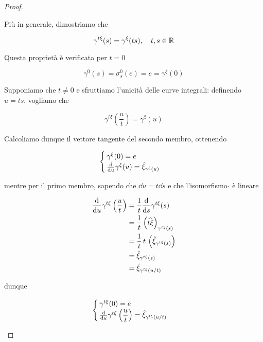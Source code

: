 \begin{proof}
\begin{enumerate}
		Più in generale, dimostriamo che
		
		\begin{equation}
			\gamma^{t \xi}(s) = \gamma^{\xi}(t s) \qcomma t,s \in \R
		\end{equation}
	
		Questa proprietà è verificata per $ t=0 $
		
		\begin{equation}
			\gamma^{0}(s) = \sigma_{s}^{0}(e) = e = \gamma^{\xi}(0)
		\end{equation}
	
		Supponiamo che $ t \neq 0 $ e sfruttiamo l'unicità delle curve integrali: definendo $ u = t s $, vogliamo che
		
		\begin{equation}
			\gamma^{t \xi} \left( \dfrac{u}{t} \right) = \gamma^{\xi}(u)
		\end{equation}
		
		Calcoliamo dunque il vettore tangente del secondo membro, ottenendo
		
		\begin{equation}
			\begin{cases}
				\gamma^{\xi}(0) = e\\
				\dv{u} \gamma^{\xi}(u) = \hat{\xi}_{\gamma^{\xi}(u)}
			\end{cases}
		\end{equation}
	
		mentre per il primo membro, sapendo che $ \dd{u} = t \dd{s} $ e che l'isomorfismo $ \hat{} $ è lineare
		
		\begin{align}
			\begin{split}
				\dv{u} \gamma^{t \xi} \left( \dfrac{u}{t} \right) &= \dfrac{1}{t} \dv{s} \gamma^{t \xi}(s)\\
				&= \dfrac{1}{t} \left( \widehat{t \xi} \right)_{\gamma^{t \xi}(s)}\\
				&= \dfrac{1}{t} \, t \, \left( \hat{\xi}_{\gamma^{t \xi}(s)} \right)\\
				&= \hat{\xi}_{\gamma^{t \xi}(s)}\\
				&= \hat{\xi}_{\gamma^{t \xi}(u/t)}
			\end{split}
		\end{align}
	
		dunque
		
		\begin{equation}
			\begin{cases}
				\gamma^{t \xi}(0) = e\\
				\dv{u} \gamma^{t \xi} \left( \dfrac{u}{t} \right) = \hat{\xi}_{\gamma^{t \xi}(u/t)}
			\end{cases}
		\end{equation}
	

\end{enumerate}
\end{proof}
